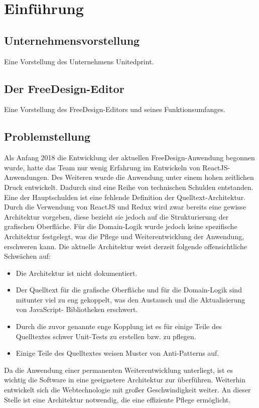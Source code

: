 \chapter{Einführung} 
\section{Unternehmensvorstellung} 
Eine Vorstellung des Unternehmens Unitedprint.
\section{Der FreeDesign-Editor}
\label{Der FreeDesign-Editor}
Eine Vorstellung des FreeDesign-Editors und seines Funktionsumfanges.

\section{Problemstellung}
Als Anfang 2018 die Entwicklung der aktuellen FreeDesign-Anwendung begonnen wurde, hatte das Team nur wenig Erfahrung im Entwickeln von ReactJS-Anwendungen. Des Weiteren wurde die Anwendung unter einem hohen zeitlichen Druck entwickelt.
Dadurch sind eine Reihe von technischen Schulden entstanden. Eine der Hauptschulden ist eine fehlende Definition der Quelltext-Architektur. Durch die Verwendung von ReactJS und Redux wird zwar bereits eine gewisse Architektur vorgeben, diese bezieht sie jedoch auf die Strukturierung der grafischen Oberfläche. Für die Domain-Logik wurde jedoch keine spezifische Architektur festgelegt, was die Pflege und Weiterentwicklung der Anwendung, erschweren kann.
Die aktuelle Architektur weist derzeit folgende offensichtliche Schwächen auf:
\begin{itemize}
  \item Die Architektur ist nicht dokumentiert.
  \item Der Quelltext für die grafische Oberfläche und für die Domain-Logik sind mitunter viel
  zu eng gekoppelt, was den Austausch und die Aktualisierung von JavaScript-
  Bibliotheken erschwert.
  \item Durch die zuvor genannte enge Kopplung ist es für einige Teile des Quelltextes
  schwer Unit-Tests zu erstellen bzw. zu pflegen.
  \item Einige Teile des Quelltextes weisen Muster von Anti-Patterns auf.
\end{itemize}
Da die Anwendung einer permanenten Weiterentwicklung unterliegt, ist es wichtig die Software in eine geeignetere Architektur zur überführen. Weiterhin entwickelt sich die Webtechnologie mit großer Geschwindigkeit weiter. An dieser Stelle ist eine Architektur notwendig, die eine effiziente Pflege ermöglicht.

